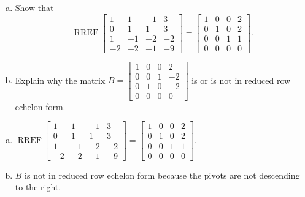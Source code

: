 
\begin{exerciseStatement}

\begin{enumerate}[(a)]
\item Show that \[\operatorname{RREF} \left[\begin{array}{cccc}
1 & 1 & -1 & 3 \\
0 & 1 & 1 & 3 \\
1 & -1 & -2 & -2 \\
-2 & -2 & -1 & -9
\end{array}\right] = \left[\begin{array}{cccc}
1 & 0 & 0 & 2 \\
0 & 1 & 0 & 2 \\
0 & 0 & 1 & 1 \\
0 & 0 & 0 & 0
\end{array}\right] .\]
\item Explain why the matrix \(B= \left[\begin{array}{cccc}
1 & 0 & 0 & 2 \\
0 & 0 & 1 & -2 \\
0 & 1 & 0 & -2 \\
0 & 0 & 0 & 0
\end{array}\right] \) is or is not in reduced row echelon form.
\end{enumerate}
    
\end{exerciseStatement}
    
\begin{exerciseAnswer} 

\begin{enumerate}[(a)]
\item \(\operatorname{RREF} \left[\begin{array}{cccc}
1 & 1 & -1 & 3 \\
0 & 1 & 1 & 3 \\
1 & -1 & -2 & -2 \\
-2 & -2 & -1 & -9
\end{array}\right] = \left[\begin{array}{cccc}
1 & 0 & 0 & 2 \\
0 & 1 & 0 & 2 \\
0 & 0 & 1 & 1 \\
0 & 0 & 0 & 0
\end{array}\right] .\)
\item \(B\) is not in reduced row echelon form because the pivots are not descending to the right. 
\end{enumerate}
    
\end{exerciseAnswer}
    
